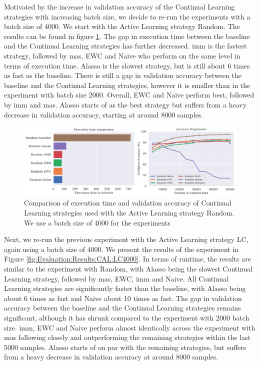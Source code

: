 Motivated by the increase in validation accuracy of the Continual Learning strategies with increasing batch size, we decide to re-run the experiments with a batch size of 4000. We start with the Active Learning
strategy Random. The results can be found in figure \ref{fig:Evaluation:Results:CAL:Random4000}. The gap in execution time between the baseline and the Continual Learning strategies has further decreased. \gls{imm} is
the fastest strategy, followed by \gls{mas}, EWC and Naive who perform on the same level in terms of execution time. Alasso is the slowest strategy, but is still about 6 times as fast as the baseline. There is still a
gap in validation accuracy between the baseline and the Continual Learning strategies, however it is smaller than in the experiment with batch size 2000. Overall, EWC and Naive perform best, followed by \gls{imm} and \gls{mas}.
Alasso starts of as the best strategy but suffers from a heavy decrease in validation accuracy, starting at around 8000 samples. \par

\begin{figure}[h]
    \centering
    \includegraphics[width=\linewidth]{images/results_CAL/Random_CAL_4000b.png}
    \caption[Continual Active Learning Random 4000 batch size]{Comparison of execution time and validation accuracy of Continual Learning strategies used with the Active Learning strategy
    Random. We use a batch size of 4000 for the experiments}
    \label{fig:Evaluation:Results:CAL:Random4000}
\end{figure}

Next, we re-run the previous experiment with the Active Learning strategy LC, again using a batch size of 4000. We present the results of the experiment in Figure \ref{fig:Evaluation:Results:CAL:LC4000}. In terms of runtime,
the results are similar to the experiment with Random, with Alasso being the slowest Continual Learning strategy, followed by \gls{mas}, EWC, \gls{imm} and Naive. All Continual Learning strategies are significantly faster than the baseline,
with Alasso being about 6 times as fast and Naive about 10 times as fast. The gap in validation accuracy between the baseline and the Continual Learning strategies remains significant, although it has shrunk compared to the
experiment with 2000 batch size. \gls{imm}, EWC and Naive perform almost identically across the experiment with \gls{mas} following closely and outperforming the remaining strategies within the last 5000 samples. Alasso starts of on par
with the remaining strategies, but suffers from a heavy decrease in validation accuracy at around 8000 samples. \par

